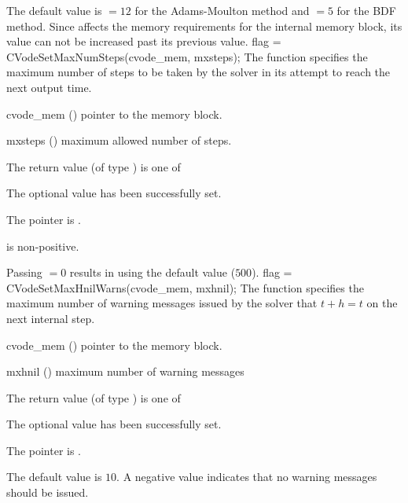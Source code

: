 {
  The default value is  $= 12$ for
  the Adams-Moulton method and  $= 5$
  for the BDF method.
  Since  affects the memory requirements
  for the internal {\cvode} memory block, its value
  can not be increased past its previous value.
}
{
flag = CVodeSetMaxNumSteps(cvode\_mem, mxsteps);
}
{
  The function  specifies the maximum number
  of steps to be taken by the solver in its attempt to reach 
  the next output time.
}
{
  \begin{args}
  \item[cvode\_mem] ()
    pointer to the {\cvode} memory block.
  \item[mxsteps] ()
    maximum allowed number of steps.
  \end{args}
}
{
  The return value  (of type ) is one of
  \begin{args}
  \item[\Id{CV\_SUCCESS}] 
    The optional value has been successfully set.
  \item[\Id{CV\_MEM\_NULL}]
    The  pointer is .
  \item[\Id{CV\_ILL\_INPUT}]
     is non-positive.
  \end{args}
}
{
  Passing $=0$ results in {\cvode} using the default value ($500$).
}
{
flag = CVodeSetMaxHnilWarns(cvode\_mem, mxhnil);
}
{
  The function  specifies the maximum number of warning
  messages issued by the solver that $t+h=t$ on the next internal step.
}
{
  \begin{args}
  \item[cvode\_mem] ()
    pointer to the {\cvode} memory block.
  \item[mxhnil] ()
    maximum number of warning messages
  \end{args}
}
{
  The return value  (of type ) is one of
  \begin{args}
  \item[\Id{CV\_SUCCESS}] 
    The optional value has been successfully set.
  \item[\Id{CV\_MEM\_NULL}]
    The  pointer is .
  \end{args}
}
{
  The default value is $10$.
  A negative  value indicates that no warning messages should
  be issued.
}
